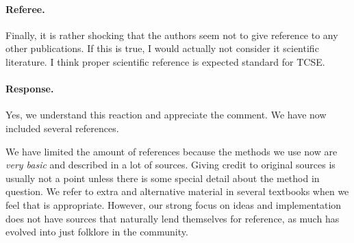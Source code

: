 \documentclass[%
oneside,                 %
final,                   %
10pt]{article}
\begin{document}
\paragraph{Referee.}
Finally, it is rather shocking that the authors seem not to give reference to any other publications. If this is true, I would actually not consider it scientific literature. I think proper scientific reference is expected standard for TCSE.

\paragraph{Response.}
Yes, we understand this reaction and appreciate the comment. We have now included several references.

We have limited the amount of references because the methods we use
now are \emph{very basic} and described in a lot of sources. Giving
credit to original sources is usually not a point unless there is some
special detail about the method in question.  We refer to extra and alternative
material in several textbooks when we feel that is
appropriate. However, our strong focus on ideas and implementation
does not have sources that naturally lend themselves for reference, as
much has evolved into just folklore in the community.





\end{document}
